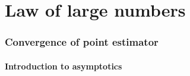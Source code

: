 

\part*{Law of large numbers}%

\section{Convergence of point estimator}

\subsection{Introduction to asymptotics}

